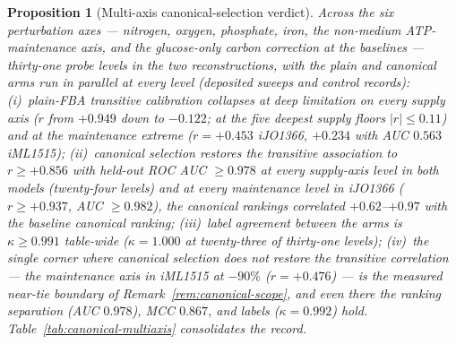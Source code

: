 \documentclass[11pt,a4paper]{article}
\theoremstyle{plain}
\newtheorem{proposition}[theorem]{Proposition}
\theoremstyle{definition}
\theoremstyle{remark}
\begin{document}
\begin{proposition}[Multi-axis canonical-selection verdict]
\label{prop:canonical-multiaxis}
Across the six perturbation axes --- nitrogen, oxygen, phosphate,
iron, the non-medium ATP-maintenance axis, and the glucose-only
carbon correction at the baselines --- thirty-one probe levels in
the two reconstructions, with the plain and canonical arms run in
parallel at every level (deposited sweeps and control records):
(i)~plain-FBA transitive calibration collapses at deep limitation
on every supply axis ($r$ from $+0.949$ down to $-0.122$; at the
five deepest supply floors $|r|\le0.11$) and at the maintenance
extreme ($r=+0.453$ iJO1366, $+0.234$ with AUC $0.563$ iML1515);
(ii)~canonical selection restores the transitive association to
$r\ge+0.856$ with held-out ROC AUC $\ge0.978$ at every supply-axis
level in both models (twenty-four levels) and at every maintenance
level in iJO1366
($r\ge+0.937$, AUC $\ge0.982$), the canonical rankings correlated
$+0.62$--$+0.97$ with the baseline canonical ranking;
(iii)~label agreement between the arms is $\kappa\ge0.991$
table-wide ($\kappa=1.000$ at twenty-three of thirty-one levels);
(iv)~the single corner where canonical selection does not restore
the transitive correlation --- the maintenance axis in iML1515 at
$-90\%$ ($r=+0.476$) --- is the measured near-tie boundary of
Remark~\ref{rem:canonical-scope}, and even there the ranking
separation (AUC $0.978$), MCC $0.867$, and labels ($\kappa=0.992$)
hold. Table~\ref{tab:canonical-multiaxis} consolidates the record.
\end{proposition}
\end{document}
